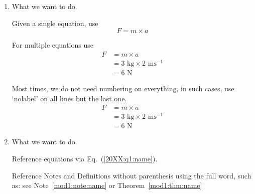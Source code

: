 \begin{enumerate}[label = \bfseries (\alph*)]

\item What we want to do.

Given a single equation, use
\begin{equation} \label{20XX:q1:name}
	F = m \times a
\end{equation}

For multiple equations use
\begin{align}
	F &= m \times a \\
	  &= 3\text{ kg} \times 2 \text{ ms}^{-1} \\
	  &= 6 \text{ N}
\end{align}

Most times, we do not need numbering on everything, in such
cases, use `nolabel' on all lines but the last one.
\begin{align}
	F &= m \times a \nonumber \\
	  &= 3\text{ kg} \times 2 \text{ ms}^{-1} \nonumber \\
	  &= 6 \text{ N}
\end{align}

\item What we want to do.

Reference equations via Eq.~(\ref{20XX:q1:name}).

Reference Notes and Definitions without parenthesis using the full word,
such as: see Note~\ref{mod1:note:name} or Theorem~\ref{mod1:thm:name}



\end{enumerate}